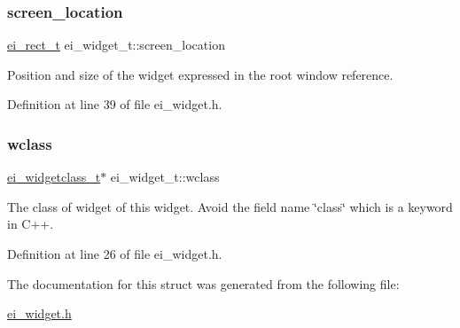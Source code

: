 \subsubsection{\texorpdfstring{screen\+\_\+location}{screen\_location}}
{\footnotesize\ttfamily \hyperlink{structei__rect__t}{ei\+\_\+rect\+\_\+t} ei\+\_\+widget\+\_\+t\+::screen\+\_\+location}



Position and size of the widget expressed in the root window reference. 



Definition at line 39 of file ei\+\_\+widget.\+h.

\mbox{\label{structei__widget__t_a429e970e1d266252df4dbe55296b9f70}} 
\subsubsection{\texorpdfstring{wclass}{wclass}}
{\footnotesize\ttfamily \hyperlink{structei__widgetclass__t}{ei\+\_\+widgetclass\+\_\+t}$\ast$ ei\+\_\+widget\+\_\+t\+::wclass}



The class of widget of this widget. Avoid the field name \char`\"{}class\char`\"{} which is a keyword in C++. 



Definition at line 26 of file ei\+\_\+widget.\+h.



The documentation for this struct was generated from the following file\+:\begin{DoxyCompactItemize}
\item 
\hyperlink{ei__widget_8h}{ei\+\_\+widget.\+h}\end{DoxyCompactItemize}
